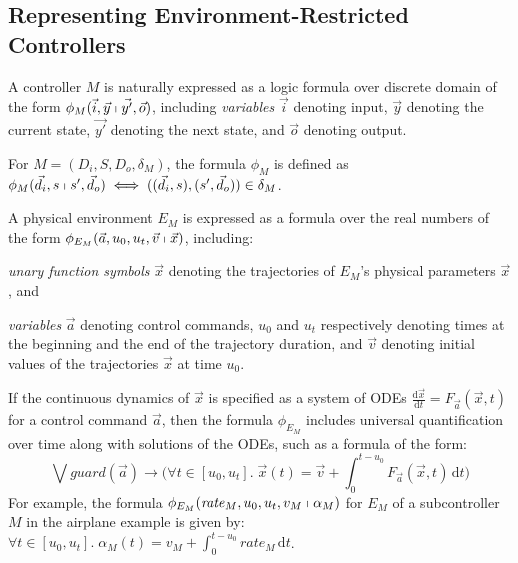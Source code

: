 \subsection{Representing Environment-Restricted Controllers}
\label{sec:discrete-encoding}

A controller $M$ is naturally 
expressed as a logic formula over discrete domain
of the form $\phi_M(\vec{i}, \vec{y} \shortmid \vec{y'}, \vec{o})$,
including \emph{variables}
$\vec{i}$ denoting input, 
$\vec{y}$ denoting the current state, 
$\vec{y'}$ denoting the next state, and 
$\vec{o}$  denoting output.

\begin{definition}
For  $M = (D_i,S,D_o,\delta_M)$,
the formula $\phi_M$ is defined as
$\phi_{M}(\vec{d}_i, s \shortmid s',  \vec{d}_o)
\iff
( (\vec{d}_i, s), (s', \vec{d}_o) ) \in \delta_{M}$.
\end{definition}



A physical environment $E_M$ is expressed as 
a formula over the real numbers %
of the form $\phi_{E_M}(\vec{a},u_0,u_t,\vec{v} \shortmid \vec{x})$,
including: \begin{inparaenum}[(i)]
	\item \emph{unary function symbols} $\vec{x}$ denoting the trajectories of $E_M$'s physical parameters $\vec{x}$,
	and
	\item \emph{variables} $\vec{a}$ denoting control commands, %
		$u_0$ and $u_t$ respectively denoting 
		times at the beginning and the end of the trajectory duration, and 
		$\vec{v}$ denoting initial values of the trajectories $\vec{x}$ at time $u_0$.
\end{inparaenum}


If the continuous dynamics of $\vec{x}$ is specified as a system of ODEs
$\frac{\mathrm{d}\vec{x}}{\mathrm{d}t}= F_{\vec{a}}(\vec{x},t)$
for a control command $\vec{a}$, then the formula $\phi_{E_M}$ 
includes universal quantification over time along with solutions of the ODEs, such as a formula of the form:
\[
\bigvee \mathit{guard}(\vec{a}) \rightarrow
\big(
\forall t \in [u_0,u_t].\;
\vec{x}(t) = \vec{v} + \int_0^{t-u_0}  F_{\vec{a}}(\vec{x},t)\,\mathrm{d}t
\big)
\]
For example, 
the formula $\phi_{E_M}(\mathit{rate}_M,u_0,u_t,v_M \shortmid \alpha_M)$
for 
$E_M$ of a subcontroller $M$ in the airplane example is given by:
$\forall t \in [u_0, u_t].\; \alpha_M(t) = v_M + \int_0^{t-u_0}  \mathit{rate}_M \,\mathrm{d}t$.


